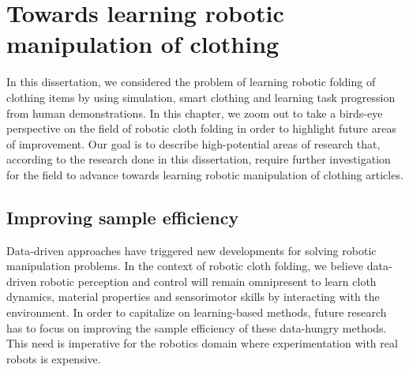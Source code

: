 \documentclass[\home/main.tex]{subfiles}
\begin{document}
\chapter{Towards learning robotic manipulation of clothing} \label{ch:towards_robotic_folding}

In this dissertation, we considered the problem of learning robotic folding of clothing items by using simulation, smart clothing and learning task progression from human demonstrations. In this chapter, we zoom out to take a birds-eye perspective on the field of robotic cloth folding in order to highlight future areas of improvement. Our goal is to describe high-potential areas of research that, according to the research done in this dissertation, require further investigation for the field to advance towards learning robotic manipulation of clothing articles.

\section{Improving sample efficiency}

Data-driven approaches have triggered new developments for solving robotic manipulation problems. In the context of robotic cloth folding, we believe data-driven robotic perception and control will remain omnipresent to learn cloth dynamics, material properties and sensorimotor skills by interacting with the environment. In order to capitalize on learning-based methods, future research has to focus on improving the sample efficiency of these data-hungry methods. This need is imperative for the robotics domain where experimentation with real robots is expensive. 
\end{document}
